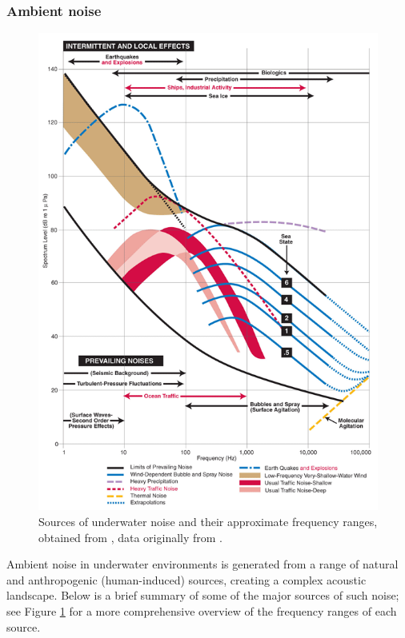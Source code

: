 \subsubsection{Ambient noise}

\begin{figure}[p]
    \centering
    \includegraphics[width=\textwidth]{img/ch1/uw_noise.png}
    \caption{Sources of underwater noise and their approximate frequency ranges, obtained from \cite{knowlton_what_nodate}, data originally from \cite{wenz_review_1972}.}
    \label{fig:uw-noise}
\end{figure}

Ambient noise in underwater environments is generated from a range of natural and anthropogenic (human-induced) sources, creating a complex acoustic landscape. Below is a brief summary of some of the major sources of such noise; see Figure \ref{fig:uw-noise} for a more comprehensive overview of the frequency ranges of each source.

